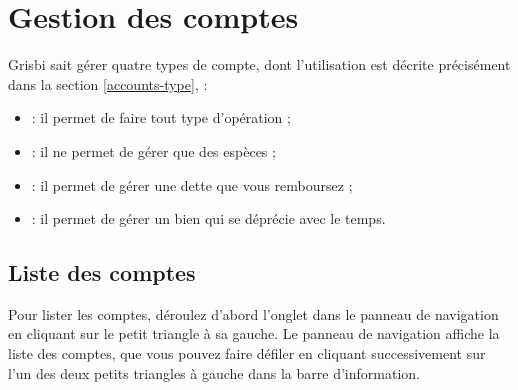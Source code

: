
\chapter{Gestion des comptes\label{accounts} }

Grisbi sait gérer quatre types de compte, dont l'utilisation est décrite précisément dans la section \vref{accounts-type},  :
\begin{itemize}
	\item {} : il permet de faire tout type d'opération ;
	\item {} : il ne permet de gérer que des espèces ;
	\item {} : il permet de gérer une dette que vous remboursez ; 
	\item {} : il permet de gérer un bien qui se déprécie avec le temps. 
\end{itemize}


\section{Liste des comptes\label{accounts-list}}


Pour lister les comptes, déroulez d'abord l'onglet  dans le panneau de navigation en cliquant sur le petit triangle à sa gauche. Le panneau de navigation affiche la liste des comptes, que vous pouvez faire défiler en cliquant successivement sur l'un des deux petits triangles à gauche dans la barre d'information.

